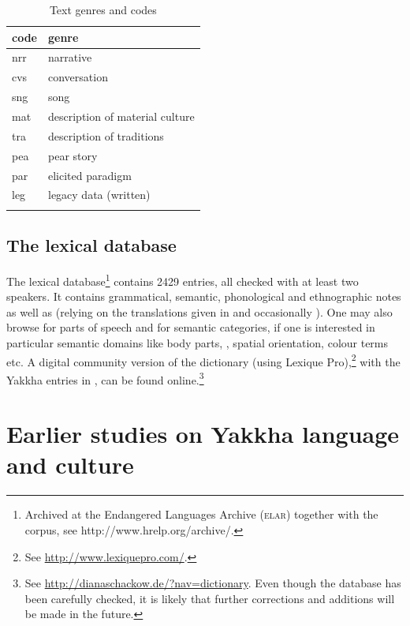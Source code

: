 \begin{table}
\begin{center}
\begin{tabular}{ll}
\lsptoprule
{\sc code}&{\sc genre}\\
\midrule
nrr & narrative \\
cvs & conversation \\
sng & song\\
mat & description of material culture\\
tra & description of traditions\\
pea & pear story\\
par & elicited paradigm\\
leg & legacy data (written)\\
\lspbottomrule
\end{tabular}
\caption{Text genres and codes}\label{tab-genre}
\end{center}
\end{table}


\subsection{The lexical database}

The lexical database\footnote{Archived at the Endangered Languages Archive (\textsc{elar}) together with the corpus, see http://www.hrelp.org/archive/.} contains 2429 entries, all checked with at least two speakers. It contains grammatical, semantic, phonological and ethnographic notes as well as  (relying on the  translations given in \citet{Manandhar2002_Plants} and occasionally \citealt{Turner1931A-Comparative}). One may also browse for parts of speech and for semantic categories, if one is interested in particular semantic domains like body parts, , spatial orientation, colour terms etc. A digital community version of the dictionary (using Lexique Pro),\footnote{See \url{http://www.lexiquepro.com/}.} with the Yakkha entries in , can be found online.\footnote{See \url{http://dianaschackow.de/?nav=dictionary}. Even though the database has been carefully checked, it is likely that further corrections and additions will be made in the future.}


\section{Earlier studies on Yakkha language and culture}\label{earlier-work}


